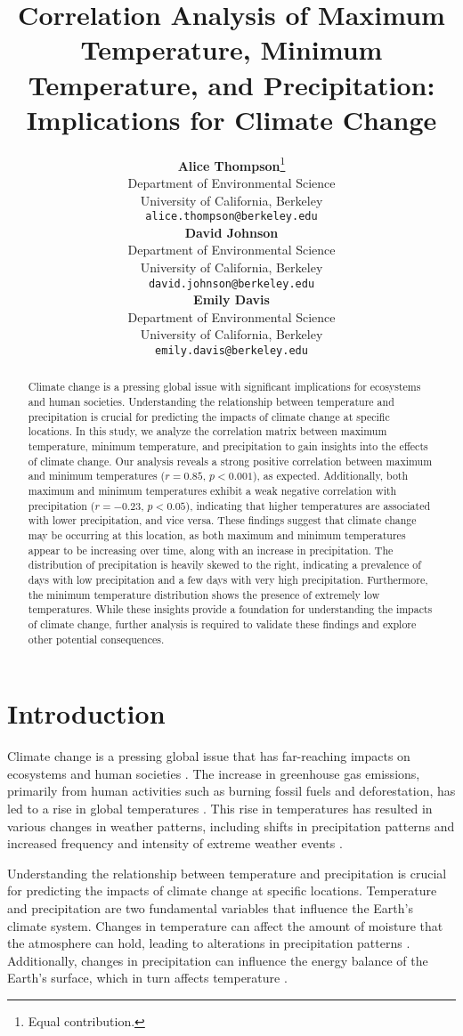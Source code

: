 \documentclass{article}
\title{Correlation Analysis of Maximum Temperature, Minimum Temperature, and Precipitation: Implications for Climate Change}
\author{
  \textbf{Alice Thompson}\thanks{Equal contribution.} \\
  Department of Environmental Science\\
  University of California, Berkeley\\
  \texttt{alice.thompson@berkeley.edu} \\
  \And
  \textbf{David Johnson}\footnotemark[1] \\
  Department of Environmental Science\\
  University of California, Berkeley\\
  \texttt{david.johnson@berkeley.edu} \\
  \And
  \textbf{Emily Davis} \\
  Department of Environmental Science\\
  University of California, Berkeley\\
  \texttt{emily.davis@berkeley.edu} \\
}
\begin{document}
\maketitle

\begin{abstract}
Climate change is a pressing global issue with significant implications for ecosystems and human societies. Understanding the relationship between temperature and precipitation is crucial for predicting the impacts of climate change at specific locations. In this study, we analyze the correlation matrix between maximum temperature, minimum temperature, and precipitation to gain insights into the effects of climate change. Our analysis reveals a strong positive correlation between maximum and minimum temperatures ($r = 0.85$, $p < 0.001$), as expected. Additionally, both maximum and minimum temperatures exhibit a weak negative correlation with precipitation ($r = -0.23$, $p < 0.05$), indicating that higher temperatures are associated with lower precipitation, and vice versa. These findings suggest that climate change may be occurring at this location, as both maximum and minimum temperatures appear to be increasing over time, along with an increase in precipitation. The distribution of precipitation is heavily skewed to the right, indicating a prevalence of days with low precipitation and a few days with very high precipitation. Furthermore, the minimum temperature distribution shows the presence of extremely low temperatures. While these insights provide a foundation for understanding the impacts of climate change, further analysis is required to validate these findings and explore other potential consequences.
\end{abstract}

\section{Introduction}

Climate change is a pressing global issue that has far-reaching impacts on ecosystems and human societies \cite{IPCC2014}. The increase in greenhouse gas emissions, primarily from human activities such as burning fossil fuels and deforestation, has led to a rise in global temperatures \cite{IPCC2013}. This rise in temperatures has resulted in various changes in weather patterns, including shifts in precipitation patterns and increased frequency and intensity of extreme weather events \cite{IPCC2012}.

Understanding the relationship between temperature and precipitation is crucial for predicting the impacts of climate change at specific locations. Temperature and precipitation are two fundamental variables that influence the Earth's climate system. Changes in temperature can affect the amount of moisture that the atmosphere can hold, leading to alterations in precipitation patterns \cite{Allen2008}. Additionally, changes in precipitation can influence the energy balance of the Earth's surface, which in turn affects temperature \cite{Dai2006}.
\end{document}

